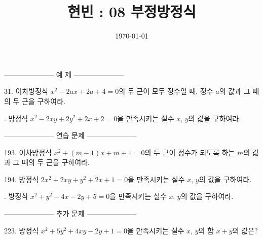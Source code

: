 \documentclass{memoir}
\begin{document}
\title{현빈 : 08 부정방정식}
\author{}
\date{\today}
\maketitle

--------------------- 예 제 ---------------------

31.
이차방정식 \(x^2-2ax+2a+4=0\)의 두 근이 모두 정수일 때, 정수 \(a\)의 값과 그 때의 두 근을 구하여라.

.
방정식 \(x^2-2xy+2y^2+2x+2=0\)을 만족시키는 실수 \(x\), \(y\)의 값을 구하여라.

--------------------- 연습 문제 ---------------------

193.
이차방정식 \(x^2+(m-1)x+m+1=0\)의 두 근이 정수가 되도록 하는 \(m\)의 값과 그 때의 두 근을 구하여라.
\bigskip

194.
방정식 \(2x^2+2xy+y^2+2x+1=0\)을 만족시키는 실수 \(x\), \(y\)의 값을 구하여라.

.
방정식 \(x^2+y^2-4x-2y+5=0\)을 만족시키는 실수 \(x\), \(y\)의 값을 구하여라.

--------------------- 추가 문제 ---------------------

223.
방정식 \(x^2+5y^2+4xy-2y+1=0\)을 만족시키는 실수 \(x\), \(y\)의 합 \(x+y\)의 값은?
\end{document}
